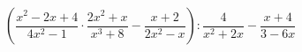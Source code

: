 \begin{ex}[type=expression]
	\begin{condition}
		\(\left( \dfrac{x^2-2x+4}{4x^2-1}\cdot\dfrac{2x^2+x}{x^3+8}-\dfrac{x+2}{2x^2-x} \right):\dfrac{4}{x^2+2x}-\dfrac{x+4}{3-6x}\)
	\end{condition}
\end{ex}